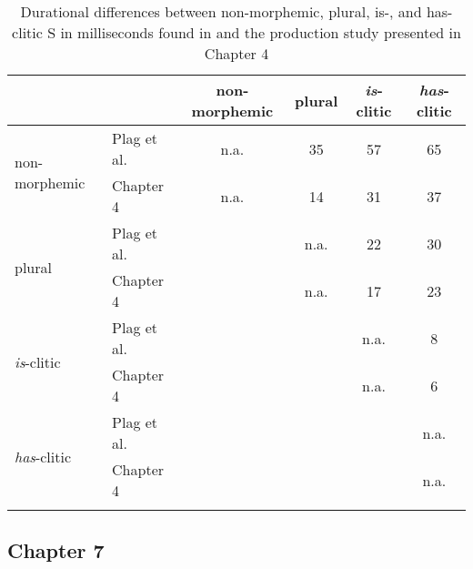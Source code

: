 \begin{table}[H]\fontsize{10}{11}
\caption{Durational differences between non-morphemic, plural, \mbox{is-,} and has-clitic S in milliseconds found in \citet{Plag2017} and the production study presented in Chapter 4}
\label{tab:6.13}
\centering
\begin{tabular}{llcccc} 
\lsptoprule
\textbf{~}                           & ~           & non-morphemic & plural & \textit{is}-clitic & \textit{has}-clitic  \\ 
\midrule
\multirow{2}{*}{non-morphemic}       & Plag et al. & n.a.          & 35     & 57                 & 65                   \\
                                     & Chapter 4   & n.a.          & 14     & 31                 & 37                   \\ 
\midrule
\multirow{2}{*}{plural}              & Plag et al. & ~             & n.a.   & 22                 & 30                   \\
                                     & Chapter 4   & ~             & n.a.   & 17                 & 23                   \\ 
\midrule
\multirow{2}{*}{\textit{is}-clitic}  & Plag et al. & ~             & ~      & n.a.               & 8                    \\
                                     & Chapter 4   & ~             & ~      & n.a.               & 6                    \\ 
\midrule
\multirow{2}{*}{\textit{has}-clitic} & Plag et al. & ~             & ~      & ~                  & n.a.                 \\
                                     & Chapter 4   & ~             & ~      & ~                  & n.a.                 \\
\lspbottomrule
\end{tabular}
\end{table}



\subsection{Chapter 7}



